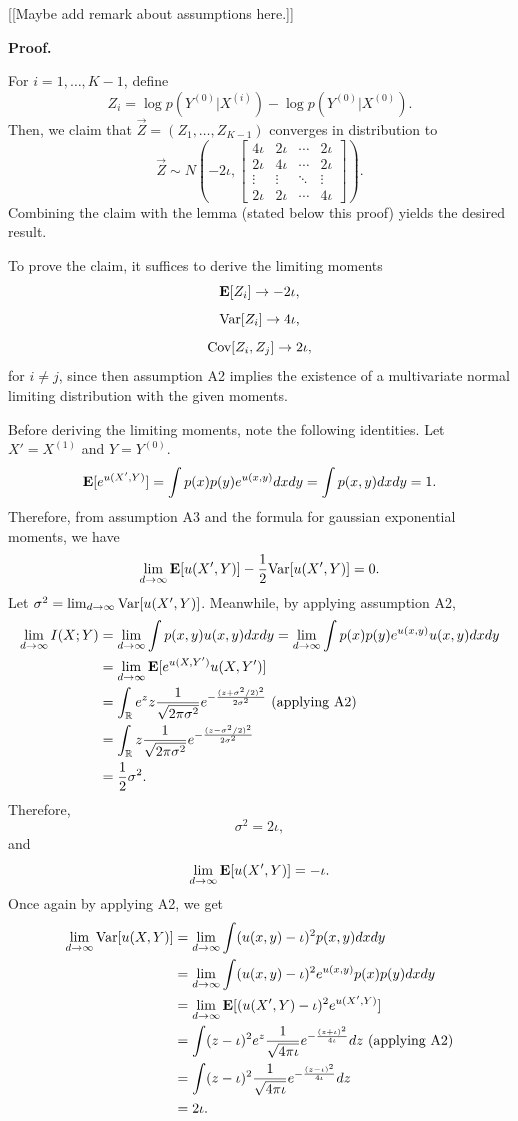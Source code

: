 \documentclass[12pt]{article}
\begin{document}
[[Maybe add remark about assumptions here.]]

\textbf{Proof.}

For $i = 1,\hdots, K-1$, define
\[
Z_i = \log p(Y^{(0)}|X^{(i)}) - \log p(Y^{(0)}|X^{(0)}).
\]
Then, we claim that $\vec{Z} = (Z_1,\hdots, Z_{K-1})$ converges in distribution to
\[
\vec{Z} \sim N\left(-2\iota, 
\begin{bmatrix}
4\iota & 2\iota & \cdots & 2\iota\\
2\iota & 4\iota & \cdots & 2\iota\\
\vdots & \vdots & \ddots & \vdots\\
2\iota & 2\iota & \cdots & 4\iota
\end{bmatrix}
\right).
\]
Combining the claim with the lemma (stated below this proof) yields the
desired result.

To prove the claim, it suffices to derive the limiting moments
\[\textbf{E}[Z_i] \to -2\iota,\]
\[\text{Var}[Z_i] \to 4\iota,\]
\[\text{Cov}[Z_i, Z_j] \to 2\iota,\]
for $i \neq j$,
since then assumption A2 implies the existence of a multivariate normal
limiting distribution with the given moments.

Before deriving the limiting moments, note the following identities.
Let $X' = X^{(1)}$ and $Y = Y^{(0)}$.
\[
\textbf{E}[e^{u(X', Y)}] = \int p(x) p(y) e^{u(x, y)} dx dy = \int p(x, y) dx dy = 1.
\]
Therefore, from assumption A3 and the formula for gaussian exponential
moments, we have
\[
\lim_{d \to \infty} \textbf{E}[u(X', Y)]-\frac{1}{2}\text{Var}[u(X', Y)] = 0.
\]
Let $\sigma^2 = \lim_{d \to \infty} \text{Var}[u(X', Y)]$.
Meanwhile, by applying assumption A2,
\begin{align*}
\lim_{d \to \infty} I(X; Y) &= \lim_{d \to \infty} \int p(x, y) u(x, y) dx dy 
= \lim_{d \to \infty} \int p(x) p(y) e^{u(x, y)} u(x, y) dx dy
\\&= \lim_{d \to \infty}  \textbf{E}[e^{u(X, Y')}u(X, Y')]
\\&= \int_{\mathbb{R}} e^z z \frac{1}{\sqrt{2\pi \sigma^2}} 
e^{-\frac{(z + \sigma^2/2)^2}{2\sigma^2}} \text{ (applying A2)}
\\&= \int_{\mathbb{R}} z \frac{1}{\sqrt{2\pi \sigma^2}} 
e^{-\frac{(z - \sigma^2/2)^2}{2\sigma^2}}
\\&= \frac{1}{2}\sigma^2.
\end{align*}
Therefore,
\[
\sigma^2 = 2\iota,
\]
and
\[
\lim_{d \to \infty} \textbf{E}[u(X', Y)] = -\iota.
\]
Once again by applying A2, we get
\begin{align*}
\lim_{d \to \infty} \text{Var}[u(X, Y)] 
&= \lim_{d \to \infty} \int (u(x, y) - \iota)^2 p(x, y) dx dy
\\&= \lim_{d \to \infty} \int (u(x, y) - \iota)^2 e^{u(x, y)} p(x) p(y) dx dy
\\&= \lim_{d \to \infty} \textbf{E}[(u(X', Y) - \iota)^2 e^{u(X', Y)}] 
\\&= \int (z - \iota)^2 e^z \frac{1}{\sqrt{4\pi\iota}} e^{-\frac{(z+\iota)^2}{4\iota}} dz \text{ (applying A2)}
\\&= \int (z - \iota)^2 \frac{1}{\sqrt{4\pi\iota}} e^{-\frac{(z-\iota)^2}{4\iota}} dz
\\&= 2\iota.
\end{align*}
\end{document}
